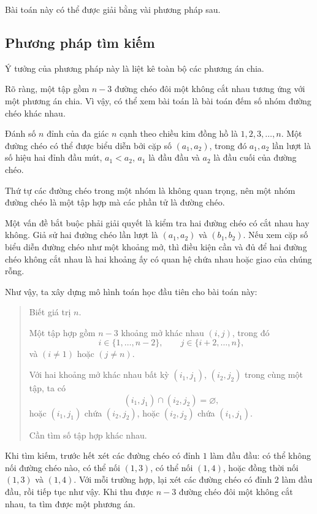 \documentclass[11pt]{article}
\begin{document}
Bài toán này có thể được giải bằng vài phương pháp sau.

\subsection{Phương pháp tìm kiếm}

Ý tưởng của phương pháp này là liệt kê toàn bộ các phương án chia.

Rõ ràng, một tập gồm \(n-3\) đường chéo đôi một không cắt nhau tương ứng với
một phương án chia. Vì vậy, có thể xem bài toán là bài toán đếm số nhóm đường
chéo khác nhau.

Đánh số \(n\) đỉnh của đa giác \(n\) cạnh theo chiều kim đồng hồ là
\(1,2,3,\ldots,n\). Một đường chéo có thể được biểu diễn bởi cặp số
\((a_1,a_2)\), trong đó \(a_1,a_2\) lần lượt là số hiệu hai đỉnh đầu mút,
\(a_1<a_2\), \(a_1\) là đầu đầu và \(a_2\) là đầu cuối của đường chéo.

Thứ tự các đường chéo trong một nhóm là không quan trọng, nên một nhóm đường
chéo là một tập hợp mà các phần tử là đường chéo.

Một vấn đề bắt buộc phải giải quyết là kiểm tra hai đường chéo có cắt nhau
hay không. Giả sử hai đường chéo lần lượt là \((a_1,a_2)\) và \((b_1,b_2)\).
Nếu xem cặp số biểu diễn đường chéo như một khoảng mở, thì điều kiện cần và
đủ để hai đường chéo không cắt nhau là hai khoảng ấy có quan hệ chứa nhau hoặc
giao của chúng rỗng.

Như vậy, ta xây dựng mô hình toán học đầu tiên cho bài toán này:
\begin{quote}
Biết giá trị \(n\).

Một tập hợp gồm \(n-3\) khoảng mở khác nhau \((i,j)\), trong đó
\[
  i\in\{1,\ldots,n-2\},\qquad
  j\in\{i+2,\ldots,n\},
\]
và \((i\ne 1)\) hoặc \((j\ne n)\).

Với hai khoảng mở khác nhau bất kỳ \((i_1,j_1)\), \((i_2,j_2)\) trong cùng
một tập, ta có
\[
  (i_1,j_1)\cap(i_2,j_2)=\varnothing,
\]
hoặc \((i_1,j_1)\) chứa \((i_2,j_2)\), hoặc \((i_2,j_2)\) chứa
\((i_1,j_1)\).

Cần tìm số tập hợp khác nhau.
\end{quote}

Khi tìm kiếm, trước hết xét các đường chéo có đỉnh \(1\) làm đầu đầu: có thể
không nối đường chéo nào, có thể nối \((1,3)\), có thể nối \((1,4)\), hoặc
đồng thời nối \((1,3)\) và \((1,4)\). Với mỗi trường hợp, lại xét các đường
chéo có đỉnh \(2\) làm đầu đầu, rồi tiếp tục như vậy. Khi thu được \(n-3\)
đường chéo đôi một không cắt nhau, ta tìm được một phương án.
\end{document}
